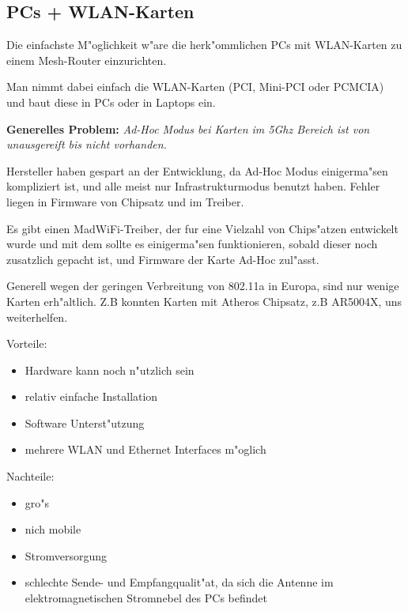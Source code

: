 \subsection{PCs + WLAN-Karten}

Die einfachste M"oglichkeit w"are die herk"ommlichen PCs mit WLAN-Karten
zu einem Mesh-Router einzurichten.

Man nimmt dabei einfach die WLAN-Karten (PCI, Mini-PCI oder PCMCIA) und
baut diese in PCs oder in Laptops ein.

\textbf{Generelles Problem:}\emph{ Ad-Hoc Modus bei Karten im 5Ghz 
Bereich ist von unausgereift bis nicht vorhanden.}

Hersteller haben gespart an der Entwicklung, da Ad-Hoc Modus
einigerma"sen kompliziert ist, und alle meist nur Infrastrukturmodus
benutzt haben. Fehler liegen in Firmware von Chipsatz und im Treiber.

Es gibt einen MadWiFi-Treiber, der fur eine Vielzahl von Chips"atzen
entwickelt wurde und mit dem sollte es einigerma"sen funktionieren, sobald
dieser noch zusatzlich gepacht ist, und Firmware der Karte Ad-Hoc zul"asst.

Generell wegen der geringen Verbreitung von 802.11a in Europa, sind
nur wenige Karten erh"altlich. Z.B konnten Karten mit Atheros Chipsatz,
z.B AR5004X, uns weiterhelfen.

Vorteile:
\begin{itemize} 
\item Hardware kann noch n"utzlich sein 
\item relativ einfache Installation 
\item Software Unterst"utzung 
\item mehrere WLAN und Ethernet Interfaces m"oglich 
\end{itemize}

Nachteile: 
\begin{itemize}
\item gro"s
\item nich mobile
\item Stromversorgung 
\item schlechte Sende- und Empfangqualit"at, da sich die Antenne im
elektromagnetischen Stromnebel des PCs befindet
\end{itemize}




